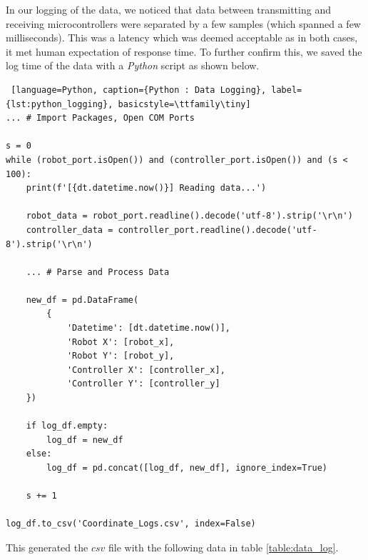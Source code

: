 \documentclass{article}
\begin{document}
In our logging of the data, we noticed that data between transmitting and receiving microcontrollers were separated by a few samples (which spanned a few milliseconds). This was a latency which
was deemed acceptable as in both cases, it met human expectation of response time. To further confirm this, we saved the log time of the data with a \textit{Python} script as shown below.

\begin{lstlisting} [language=Python, caption={Python : Data Logging}, label={lst:python_logging}, basicstyle=\ttfamily\tiny]
... # Import Packages, Open COM Ports

s = 0
while (robot_port.isOpen()) and (controller_port.isOpen()) and (s < 100):
    print(f'[{dt.datetime.now()}] Reading data...')

    robot_data = robot_port.readline().decode('utf-8').strip('\r\n')
    controller_data = controller_port.readline().decode('utf-8').strip('\r\n')

    ... # Parse and Process Data

    new_df = pd.DataFrame(
        {
            'Datetime': [dt.datetime.now()],
            'Robot X': [robot_x],
            'Robot Y': [robot_y],
            'Controller X': [controller_x],
            'Controller Y': [controller_y]
    })

    if log_df.empty:
        log_df = new_df
    else:
        log_df = pd.concat([log_df, new_df], ignore_index=True)

    s += 1

log_df.to_csv('Coordinate_Logs.csv', index=False)
\end{lstlisting}

This generated the $csv$ file with the following data in table \ref{table:data_log}.
\end{document}
